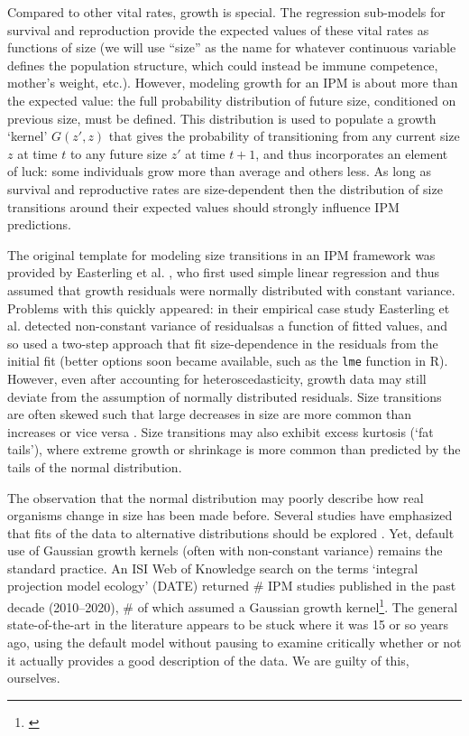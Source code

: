 \documentclass[11pt]{article}
\newcommand{\tom}[2]{{\color{red}{#1}}\footnote{\textit{\color{red}{#2}}}}
\begin{document}
{Compared to other vital rates, growth is special. 
The regression sub-models for survival and reproduction provide the expected values of these vital rates as functions of size (we will use ``size'' as the name
for whatever continuous variable defines the population structure, which could instead be immune competence, mother's weight, etc.).   
However, modeling growth for an IPM is about more than the expected value: the full probability distribution of future size, conditioned on previous size, must be defined. 
This distribution is used to populate a growth `kernel' $G(z',z)$ that gives the probability of transitioning from any current size $z$ at time $t$ to any future size $z'$ at time $t+1$, and thus incorporates an element of luck: some individuals grow more than average and others less.
As long as survival and reproductive rates are size-dependent then the distribution of size transitions around their expected values should strongly influence IPM predictions. 

The original template for modeling size transitions in an IPM framework was provided by Easterling et al. \citeyear{easterling2000size}, who first used simple linear regression and thus assumed that growth residuals were normally distributed with constant variance. 
Problems with this quickly appeared: in their empirical case
study Easterling et al. detected non-constant variance of residualsas a function of
fitted values, and so used a two-step approach that fit size-dependence in the residuals
from the initial fit (better options soon became available, such as the \texttt{lme} function
in R). However, even after accounting for heteroscedasticity, growth data may still deviate from the assumption of normally distributed residuals. 
Size transitions are often skewed such that large decreases in size are more common than increases \citep{peterson2019improving,salguero2010keeping} or vice versa \citep{stubberud2019effects}.
Size transitions may also exhibit excess kurtosis (`fat tails'), where extreme growth or shrinkage is more common than predicted by the tails of the normal distribution. 

The observation that the normal distribution may poorly describe how real organisms change in size has been made before. 
Several studies have emphasized that fits of the data to alternative distributions should be explored \citep{easterling2000size,peterson2019improving,rees2014building,williams2012avoiding}. 
Yet, default use of Gaussian growth kernels (often with non-constant variance) remains the standard practice. 
An ISI Web of Knowledge search on the terms `integral projection model ecology' (DATE) returned \# IPM studies published in the past decade (2010--2020), \# of which assumed a Gaussian growth kernel\tom{}{Not sure if this is worth the trouble of doing, so I am just writing in placeholders for now. I think I know what I would find.}.
The general state-of-the-art in the literature appears to be stuck where it was 15 or so years ago, using the default model without pausing to examine critically whether or not it actually provides a good description of the data. 
We are guilty of this, ourselves. 

}
\end{document}
